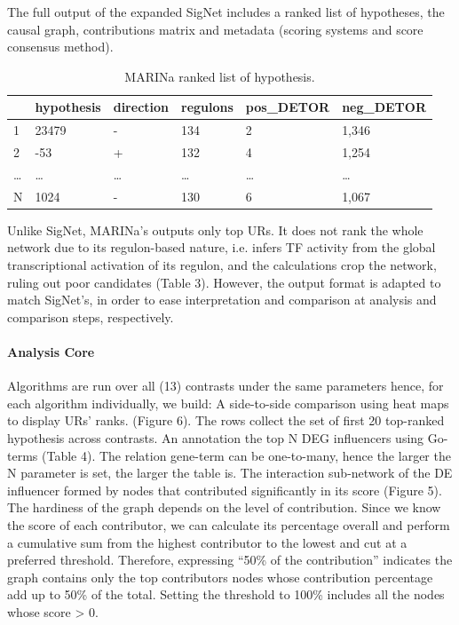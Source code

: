 The full output of the expanded SigNet includes a ranked list of hypotheses, the causal graph, contributions matrix and metadata (scoring systems and score consensus method).

\begin{table}[]
\centering
\begin{tabular}{|l|l|l|l|l|l|}
\hline
  & hypothesis & direction & regulons & pos\_DETOR & neg\_DETOR \\ \hline
1 & 23479      & -         & 134      & 2          & 1,346      \\ \hline
2 & -53        & +         & 132      & 4          & 1,254      \\ \hline
… & …          & …         & …        & …          & …          \\ \hline
N & 1024       & -         & 130      & 6          & 1,067      \\ \hline
\end{tabular}
\caption{MARINa ranked list of hypothesis.}
\label{tbl:marina_input}
\end{table}

Unlike SigNet, MARINa’s outputs only top URs. It does not rank the whole network due to its regulon-based nature, i.e. infers TF activity from the global transcriptional activation of its regulon, and the calculations crop the network, ruling out poor candidates (Table 3). 
However, the output format is adapted to match SigNet’s, in order to ease interpretation and comparison at analysis and comparison steps, respectively.

\paragraph{Analysis Core}
Algorithms are run over all (13) contrasts under the same parameters hence, for each algorithm individually, we build:
A side-to-side comparison using heat maps to display URs’ ranks. (Figure 6). The rows collect the set of first 20 top-ranked hypothesis across contrasts.
An annotation the top N DEG influencers using Go-terms (Table 4). The relation gene-term can be one-to-many, hence the larger the N parameter is set, the larger the table is.
The interaction sub-network of the DE influencer formed by nodes that contributed significantly in its score (Figure 5). The hardiness of the graph depends on the level of contribution. Since we know the score of each contributor, we can calculate its percentage overall and perform a cumulative sum from the highest contributor to the lowest and cut at a preferred threshold. 
Therefore, expressing “50\% of the contribution” indicates the graph contains only the top contributors nodes whose contribution percentage add up to 50\% of the total. Setting the threshold to 100\% includes all the nodes whose score > 0.
\\

